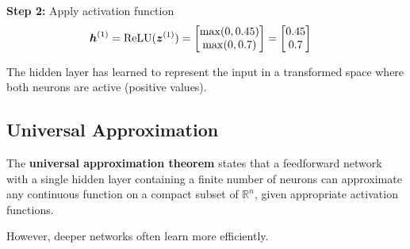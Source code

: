 \begin{example}
\textbf{Step 2:} Apply activation function
\begin{align}
\boldsymbol{h}^{(1)} &= \text{ReLU}(\boldsymbol{z}^{(1)}) = \begin{bmatrix} \max(0, 0.45) \\ \max(0, 0.7) \end{bmatrix} = \begin{bmatrix} 0.45 \\ 0.7 \end{bmatrix}
\end{align}

The hidden layer has learned to represent the input in a transformed space where both neurons are active (positive values).
\end{example}

\subsection{Universal Approximation}

The \textbf{universal approximation theorem} states that a feedforward network with a single hidden layer containing a finite number of neurons can approximate any continuous function on a compact subset of $\mathbb{R}^n$, given appropriate activation functions.

However, deeper networks often learn more efficiently.


